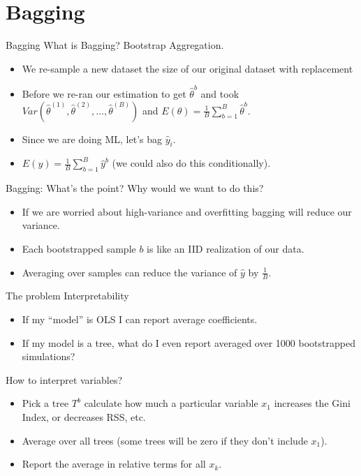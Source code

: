 \documentclass[xcolor=pdftex,dvipsnames,table,mathserif,aspectratio=169]{beamer}
\begin{document}
\section{Bagging}
\begin{frame}{Bagging}
What is \alert{Bagging}? \alert{B}ootstrap \alert{Agg}regation.
\begin{itemize}
\item We re-sample a new dataset the size of our original dataset \alert{with replacement}
\item Before we re-ran our estimation to get $\hat{\theta}^b$ and took $Var(\hat{\theta}^{(1)},\hat{\theta}^{(2)},\ldots,\hat{\theta}^{(B)})$ and $E(\theta)=\frac{1}{B} \sum_{b=1}^B \hat{\theta}^b$.
\item Since we are doing ML, let's bag $\hat{y}_i$.
\item $E(y )=\frac{1}{B} \sum_{b=1}^B \hat{y}^b$ (we could also do this conditionally).
\end{itemize}
\end{frame}

\begin{frame}{Bagging: What's the point?}
Why would we want to do this?
\begin{itemize}
\item If we are worried about high-variance and \alert{overfitting} bagging will reduce our variance.
\item Each bootstrapped sample $b$ is like an IID realization of our data.
\item Averaging over  samples can reduce the variance of $\hat{y}$ by $\frac{1}{B}$.
\end{itemize}
The problem \alert{Interpretability}
\begin{itemize}
\item If my ``model'' is OLS I can report average coefficients.
\item If my model is a tree, what do I even report averaged over 1000 bootstrapped simulations?
\end{itemize}
\end{frame}

\begin{frame}{How to interpret variables?}
\begin{itemize}
\item Pick a tree $T^b$ calculate how much a particular variable $x_1$ increases the Gini Index, or decreases RSS, etc.
\item Average over all trees (some trees will be zero if they don't include $x_1$).
\item Report the average in \alert{relative} terms for all $x_k$.
\end{itemize}

\end{frame}
\end{document}
